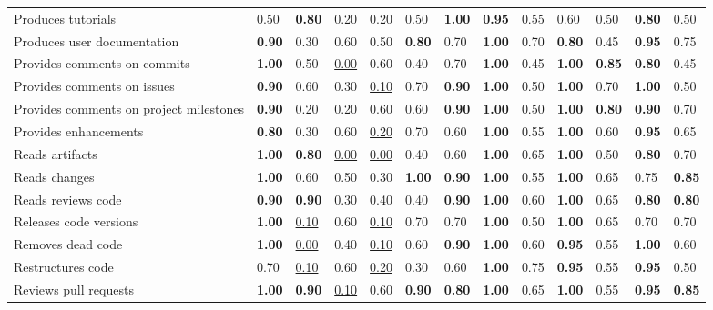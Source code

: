 \begin{tabular}{lllllllllllll}
Produces tutorials & 0.50 & \textbf{0.80} & \underline{0.20} & \underline{0.20} & 0.50 & \textbf{1.00} & \textbf{0.95} & 0.55 & 0.60 & 0.50 & \textbf{0.80} & 0.50 \\
Produces user documentation & \textbf{0.90} & 0.30 & 0.60 & 0.50 & \textbf{0.80} & 0.70 & \textbf{1.00} & 0.70 & \textbf{0.80} & 0.45 & \textbf{0.95} & 0.75 \\
Provides comments on commits & \textbf{1.00} & 0.50 & \underline{0.00} & 0.60 & 0.40 & 0.70 & \textbf{1.00} & 0.45 & \textbf{1.00} & \textbf{0.85} & \textbf{0.80} & 0.45 \\
Provides comments on issues & \textbf{0.90} & 0.60 & 0.30 & \underline{0.10} & 0.70 & \textbf{0.90} & \textbf{1.00} & 0.50 & \textbf{1.00} & 0.70 & \textbf{1.00} & 0.50 \\
Provides comments on project milestones & \textbf{0.90} & \underline{0.20} & \underline{0.20} & 0.60 & 0.60 & \textbf{0.90} & \textbf{1.00} & 0.50 & \textbf{1.00} & \textbf{0.80} & \textbf{0.90} & 0.70 \\
Provides enhancements & \textbf{0.80} & 0.30 & 0.60 & \underline{0.20} & 0.70 & 0.60 & \textbf{1.00} & 0.55 & \textbf{1.00} & 0.60 & \textbf{0.95} & 0.65 \\
Reads artifacts & \textbf{1.00} & \textbf{0.80} & \underline{0.00} & \underline{0.00} & 0.40 & 0.60 & \textbf{1.00} & 0.65 & \textbf{1.00} & 0.50 & \textbf{0.80} & 0.70 \\
Reads changes & \textbf{1.00} & 0.60 & 0.50 & 0.30 & \textbf{1.00} & \textbf{0.90} & \textbf{1.00} & 0.55 & \textbf{1.00} & 0.65 & 0.75 & \textbf{0.85} \\
Reads reviews code & \textbf{0.90} & \textbf{0.90} & 0.30 & 0.40 & 0.40 & \textbf{0.90} & \textbf{1.00} & 0.60 & \textbf{1.00} & 0.65 & \textbf{0.80} & \textbf{0.80} \\
Releases code versions & \textbf{1.00} & \underline{0.10} & 0.60 & \underline{0.10} & 0.70 & 0.70 & \textbf{1.00} & 0.50 & \textbf{1.00} & 0.65 & 0.70 & 0.70 \\
Removes dead code & \textbf{1.00} & \underline{0.00} & 0.40 & \underline{0.10} & 0.60 & \textbf{0.90} & \textbf{1.00} & 0.60 & \textbf{0.95} & 0.55 & \textbf{1.00} & 0.60 \\
Restructures code & 0.70 & \underline{0.10} & 0.60 & \underline{0.20} & 0.30 & 0.60 & \textbf{1.00} & 0.75 & \textbf{0.95} & 0.55 & \textbf{0.95} & 0.50 \\
Reviews pull requests & \textbf{1.00} & \textbf{0.90} & \underline{0.10} & 0.60 & \textbf{0.90} & \textbf{0.80} & \textbf{1.00} & 0.65 & \textbf{1.00} & 0.55 & \textbf{0.95} & \textbf{0.85} \\

\end{tabular}
